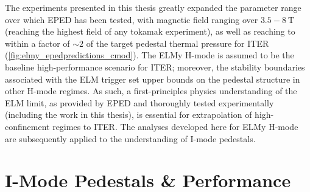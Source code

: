 \documentclass[ twoside,openright,titlepage,numbers=noenddot,headinclude,%
                footinclude=true,cleardoublepage=empty,abstractoff, %
                BCOR=5mm,paper=letter,fontsize=11pt,%
                ngerman,american,%
                ]{scrreprt}
\begin{document}
The experiments presented in this thesis greatly expanded the parameter range over which EPED has been tested, with magnetic field ranging over $3.5-\SI{8}{\tesla}$ (reaching the highest field of any tokamak experiment), as well as reaching to within a factor of $\sim 2$ of the target pedestal thermal pressure for ITER (\cref{fig:elmy_epedpredictions_cmod}).  The ELMy H-mode is assumed to be the baseline high-performance scenario for ITER; moreover, the stability boundaries associated with the ELM trigger set upper bounds on the pedestal structure in other H-mode regimes.  As such, a first-principles physics understanding of the ELM limit, as provided by EPED and thoroughly tested experimentally (including the work in this thesis), is essential for extrapolation of high-confinement regimes to ITER.  The analyses developed here for ELMy H-mode are subsequently applied to the understanding of I-mode pedestals.

\section*{I-Mode Pedestals \& Performance}

\begin{figure}[t]
 \pushtooutside
\end{figure}
\end{document}
